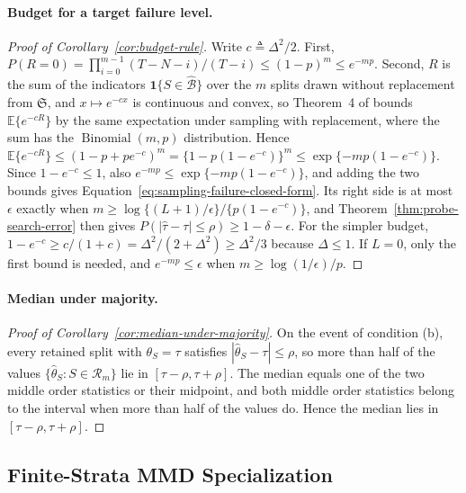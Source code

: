 \paragraph{Budget for a target failure level.}
\begin{proof}[Proof of Corollary~\ref{cor:budget-rule}]
Write $c\triangleq\Delta^2/2$. First, $P(R=0)=\prod_{i=0}^{m-1}(T-N-i)/(T-i)\le(1-p)^m\le e^{-mp}$. Second, $R$ is the sum of the indicators $\mathbf 1\{S\in\widehat{\mathcal B}\}$ over the $m$ splits drawn without replacement from $\mathfrak S$, and $x\mapsto e^{-cx}$ is continuous and convex, so Theorem~4 of \citet{hoeffding1963probability} bounds $\mathbb E\{e^{-cR}\}$ by the same expectation under sampling with replacement, where the sum has the $\operatorname{Binomial}(m,p)$ distribution. Hence $\mathbb E\{e^{-cR}\}\le(1-p+pe^{-c})^m=\{1-p(1-e^{-c})\}^m\le\exp\{-mp(1-e^{-c})\}$. Since $1-e^{-c}\le1$, also $e^{-mp}\le\exp\{-mp(1-e^{-c})\}$, and adding the two bounds gives Equation~\eqref{eq:sampling-failure-closed-form}. Its right side is at most $\epsilon$ exactly when $m\ge\log\{(L+1)/\epsilon\}/\{p(1-e^{-c})\}$, and Theorem~\ref{thm:probe-search-error} then gives $P(|\widehat\tau-\tau|\le\rho)\ge1-\delta-\epsilon$. For the simpler budget, $1-e^{-c}\ge c/(1+c)=\Delta^2/(2+\Delta^2)\ge\Delta^2/3$ because $\Delta\le1$. If $L=0$, only the first bound is needed, and $e^{-mp}\le\epsilon$ when $m\ge\log(1/\epsilon)/p$.
\end{proof}

\paragraph{Median under majority.}
\begin{proof}[Proof of Corollary~\ref{cor:median-under-majority}]

 On the event of condition (b), every retained split with $\theta_S=\tau$ satisfies $|\widehat\theta_S-\tau|\le\rho$, so more than half of the values $\{\widehat\theta_S:S\in\mathcal R_m\}$ lie in $[\tau-\rho,\tau+\rho]$. The median equals one of the two middle order statistics or their midpoint, and both middle order statistics belong to the interval when more than half of the values do. Hence the median lies in $[\tau-\rho,\tau+\rho]$.

\end{proof}

\subsection{Finite-Strata MMD Specialization}
\label{app:finite-strata-mmd-specialization}

